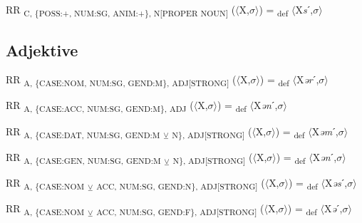 {\begin{exe}
 RR \textsubscript{C, \{POSS:+, NUM:SG, ANIM:+\}, N[PROPER NOUN]} ($\langle$X,$\sigma $$\rangle$) = \textsubscript{def} $\langle$X\textit{s}ˊ,$\sigma $$\rangle$
\end{exe}

\subsection{Adjektive}

\begin{exe}
 RR \textsubscript{A, \{CASE:NOM, NUM:SG, GEND:M\}, ADJ[STRONG]} ($\langle$X,$\sigma $$\rangle$) = \textsubscript{def} $\langle$X\textit{ər}ˊ,$\sigma $$\rangle$
\end{exe}

\begin{exe}
 RR \textsubscript{A, \{CASE:ACC, NUM:SG, GEND:M\}, ADJ} ($\langle$X,$\sigma $$\rangle$) = \textsubscript{def} $\langle$X\textit{ən}ˊ,$\sigma $$\rangle$
\end{exe}

\begin{exe}
 RR \textsubscript{A, \{CASE:DAT, NUM:SG, GEND:M} \textsubscript{${\veebar}$}\textsubscript{ N\}, ADJ[STRONG]} ($\langle$X,$\sigma $$\rangle$) = \textsubscript{def} $\langle$X\textit{əm}ˊ,$\sigma $$\rangle$
\end{exe}

\begin{exe}
 RR \textsubscript{A, \{CASE:GEN, NUM:SG, GEND:M} \textsubscript{${\veebar}$}\textsubscript{ N\}, ADJ[STRONG]} ($\langle$X,$\sigma $$\rangle$) = \textsubscript{def} $\langle$X\textit{ən}ˊ,$\sigma $$\rangle$
\end{exe}

\begin{exe}
 RR \textsubscript{A, \{CASE:NOM} \textsubscript{${\veebar}$}\textsubscript{ ACC, NUM:SG, GEND:N\}, ADJ[STRONG]} ($\langle$X,$\sigma $$\rangle$) = \textsubscript{def} $\langle$X\textit{əs}ˊ,$\sigma $$\rangle$
\end{exe}

\begin{exe}
 RR \textsubscript{A, \{CASE:NOM} \textsubscript{${\veebar}$}\textsubscript{ ACC, NUM:SG, GEND:F\}, ADJ[STRONG]} ($\langle$X,$\sigma $$\rangle$) = \textsubscript{def} $\langle$X\textit{ə}ˊ,$\sigma $$\rangle$
\end{exe}

}
